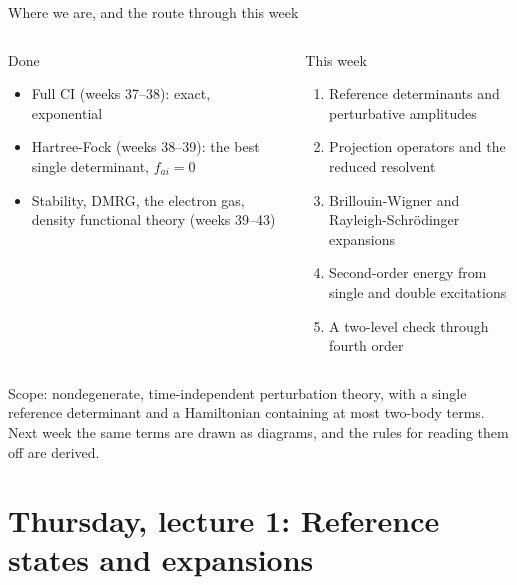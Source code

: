 \documentclass[aspectratio=169,10pt]{beamer}
\newcommand{\mbbox}[1]{%
  \begin{tcolorbox}[colback=paleblue,colframe=uioblue,title={\bfseries Many-body connection}]
  #1
  \end{tcolorbox}}
\begin{document}
\begin{frame}[shrink=12]{Where we are, and the route through this week}
  \begin{columns}[T]
    \begin{block}{Done}
      \begin{itemize}
        \item Full CI (weeks 37--38): exact, exponential
        \item Hartree-Fock (weeks 38--39): the best single determinant, $f_{ai}=0$
        \item Stability, DMRG, the electron gas, density functional theory (weeks 39--43)
      \end{itemize}
    \end{block}
    \begin{block}{This week}
      \begin{enumerate}
        \item Reference determinants and perturbative amplitudes
        \item Projection operators and the reduced resolvent
        \item Brillouin-Wigner and Rayleigh-Schr\"odinger expansions
        \item Second-order energy from single and double excitations
        \item A two-level check through fourth order
      \end{enumerate}
    \end{block}
  \end{columns}
  \vspace{0.6em}
  \mbbox{Scope: nondegenerate, time-independent perturbation theory, with a single reference determinant and a Hamiltonian containing at most two-body terms. Next week the same terms are drawn as diagrams, and the rules for reading them off are derived.}
\end{frame}

\section{Thursday, lecture 1: Reference states and expansions}
\end{document}
